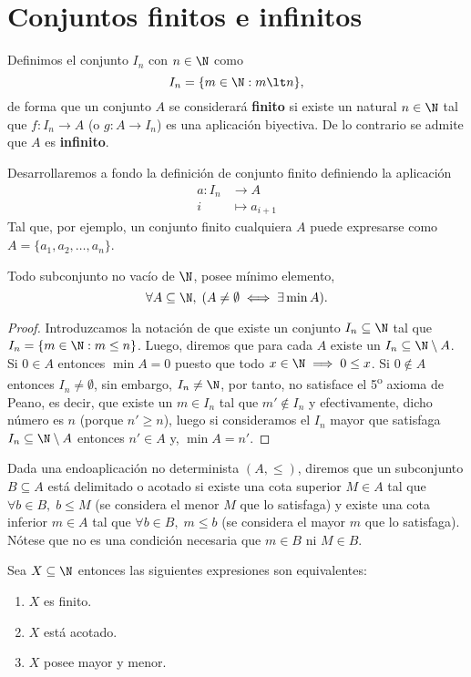 \documentclass[11pt,oneside,a4paper]{book}
\begin{document}
\section{Conjuntos finitos e infinitos}
\begin{mydef}[Finitud]
Definimos el conjunto $I_n$ con $n\in\N$ como
$$I_n=\{m\in\N:m\lt n\},$$
de forma que un conjunto $A$ se considerará \textbf{finito} si existe un natural $n\in\N$ tal que $f:I_n\rightarrow A$ (o $g:A\rightarrow I_n$) es una aplicación biyectiva. De lo contrario se admite que $A$ es \textbf{infinito}.
\end{mydef}
Desarrollaremos a fondo la definición de conjunto finito definiendo la aplicación
\begin{align*}
a:I_n&\longrightarrow A\\
i&\longmapsto a_{i+1}
\end{align*}
Tal que, por ejemplo, un conjunto finito cualquiera $A$ puede expresarse como $A=\{a_1,a_2,\dots,a_n\}$.
\begin{thm}
Todo subconjunto no vacío de $\N$, posee mínimo elemento,
$$\forall A\subseteq\N,\;(A\neq\emptyset\iff\exists\min A).$$
\end{thm}
\begin{proof}
Introduzcamos la notación de que existe un conjunto $I_n\subseteq\N$ tal que $I_n=\{m\in\N:m\leq n\}$. Luego, diremos que para cada $A$ existe un $I_n\subseteq\N\setminus A$. Si $0\in A$ entonces $\min A=0$ puesto que todo $x\in\N\implies 0\leq x$. Si $0\notin A$ entonces $I_n\neq\emptyset$, sin embargo, $I_n\neq\N$, por tanto, no satisface el 5\textsuperscript{o} axioma de Peano, es decir, que existe un $m\in I_n$ tal que $m'\notin I_n$ y efectivamente, dicho número es $n$ (porque $n'\geq n$), luego si consideramos el $I_n$ mayor que satisfaga $I_n\subseteq\N\setminus A$ entonces $n'\in A$ y, $\min A=n'$.
\end{proof}
\begin{mydef}
Dada una endoaplicación no determinista $(A,\leq)$, diremos que un subconjunto $B\subseteq A$ está delimitado o acotado si existe una cota superior $M\in A$ tal que $\forall b\in B,\;b\leq M$ (se considera el menor $M$ que lo satisfaga) y existe una cota inferior $m\in A$ tal que $\forall  b\in B,\;m\leq b$ (se considera el mayor $m$ que lo satisfaga). Nótese que no es una condición necesaria que $m\in B$ ni $M\in B$.
\end{mydef}
\begin{thm}
Sea $X\subseteq\N$ entonces las siguientes expresiones son equivalentes:
\begin{enumerate}[$a)$]
\item $X$ es finito.
\item $X$ está acotado.
\item $X$ posee mayor y menor.
\end{enumerate}
\end{thm}
\end{document}
